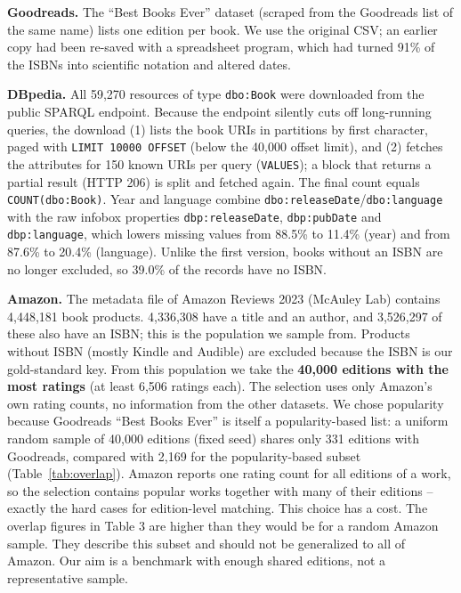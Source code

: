 \documentclass[runningheads]{llncs}
\begin{document}
\textbf{Goodreads.} The ``Best Books Ever'' dataset (scraped from the Goodreads
list of the same name) lists one edition per book. We use the original CSV;
an earlier copy had been re-saved with a spreadsheet program, which had turned
91\% of the ISBNs into scientific notation and altered dates.

\textbf{DBpedia.} All 59,270 resources of type \texttt{dbo:Book} were
downloaded from the public SPARQL endpoint. Because the endpoint silently cuts
off long-running queries, the download (1) lists the book URIs in partitions by
first character, paged with \texttt{LIMIT 10000 OFFSET} (below the 40,000 offset
limit), and (2) fetches the attributes for 150 known URIs per query
(\texttt{VALUES}); a block that returns a partial result (HTTP 206) is split
and fetched again. The final count equals \texttt{COUNT(dbo:Book)}. Year and
language combine \texttt{dbo:releaseDate}/\texttt{dbo:language} with the raw
infobox properties \texttt{dbp:releaseDate}, \texttt{dbp:pubDate} and
\texttt{dbp:language}, which lowers missing values from 88.5\% to 11.4\%
(year) and from 87.6\% to 20.4\% (language). Unlike the first version, books
without an ISBN are no longer excluded, so 39.0\% of the records have no ISBN.

\textbf{Amazon.} The metadata file of Amazon Reviews 2023 (McAuley Lab)
contains 4,448,181 book products. 4,336,308 have a title and an author, and
3,526,297 of these also have an ISBN; this is the population we sample from.
Products without ISBN (mostly Kindle and Audible) are excluded because the
ISBN is our gold-standard key. From this population we take the
\textbf{40,000 editions with the most ratings} (at least 6,506 ratings each).
The selection uses only Amazon's own rating counts, no information from the
other datasets. We chose popularity because Goodreads ``Best Books Ever'' is
itself a popularity-based list: a uniform random sample of 40,000 editions
(fixed seed) shares only 331 editions with Goodreads, compared with 2,169 for
the popularity-based subset (Table~\ref{tab:overlap}). Amazon reports one
rating count for all editions of a work, so the selection contains popular
works together with many of their editions -- exactly the hard cases for
edition-level matching. This choice has a cost. The overlap figures in Table 3 are higher than they would be for a random Amazon sample. 
They describe this subset and should not be generalized to all of Amazon. 
Our aim is a benchmark with enough shared editions, not a representative sample.
\end{document}
